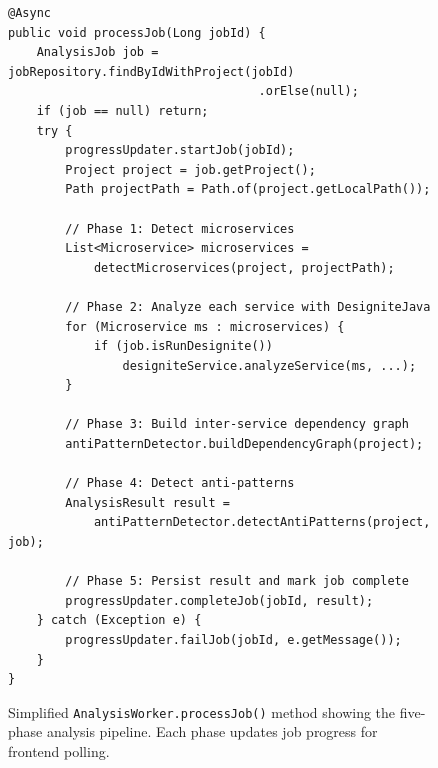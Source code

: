 \begin{figure}[htbp]
    \begin{verbatim}
@Async
public void processJob(Long jobId) {
    AnalysisJob job = jobRepository.findByIdWithProject(jobId)
                                   .orElse(null);
    if (job == null) return;
    try {
        progressUpdater.startJob(jobId);
        Project project = job.getProject();
        Path projectPath = Path.of(project.getLocalPath());

        // Phase 1: Detect microservices
        List<Microservice> microservices =
            detectMicroservices(project, projectPath);

        // Phase 2: Analyze each service with DesigniteJava
        for (Microservice ms : microservices) {
            if (job.isRunDesignite())
                designiteService.analyzeService(ms, ...);
        }

        // Phase 3: Build inter-service dependency graph
        antiPatternDetector.buildDependencyGraph(project);

        // Phase 4: Detect anti-patterns
        AnalysisResult result =
            antiPatternDetector.detectAntiPatterns(project, job);

        // Phase 5: Persist result and mark job complete
        progressUpdater.completeJob(jobId, result);
    } catch (Exception e) {
        progressUpdater.failJob(jobId, e.getMessage());
    }
}
    \end{verbatim}
    \caption{Simplified \texttt{AnalysisWorker.processJob()} method showing the five-phase analysis pipeline. Each phase updates job progress for frontend polling.}
    \label{lst:analysis-worker}
\end{figure}


